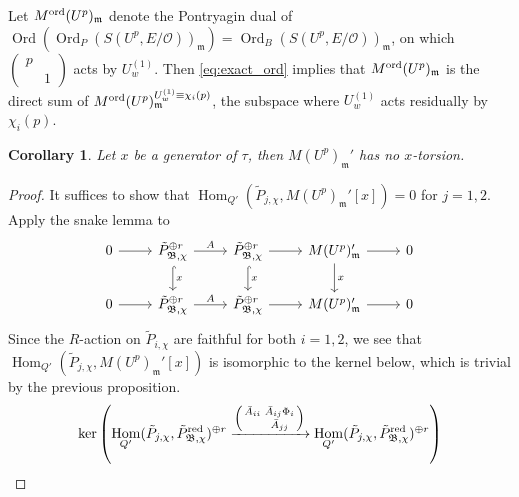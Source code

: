 \documentclass[leqno]{amsart}
\newcommand{\smat}[1]{\left( \begin{smallmatrix} #1 \end{smallmatrix} \right)}
\newcommand{\B}{\mathfrak B}
\DeclareMathOperator{\Ord}{Ord}
\newcommand{\red}{\textnormal{red}}
\newcommand{\ord}{\textnormal{ord}}
\newcommand{\oo}{\mathcal{O}} %
\newcommand{\fm}{\mathfrak{m}}
\DeclareMathOperator{\Hom}{Hom}
\newtheorem{cor}[thm]{Corollary}
\theoremstyle{definition}
\theoremstyle{remark}
\begin{document}
Let $M^{\ord}(U^p)_\fm$
denote the Pontryagin dual
of $\Ord(\Ord_P(S(U^p,E/\oo))_{\fm})=\Ord_B(S(U^p,E/\oo))_{\fm}$,
on which $\smat{p&\\&1}$ acts by  $U_{w}^{(1)}$.
Then \eqref{eq:exact_ord}
implies that 
$M^{\ord}(U^p)_{\fm}$ is the direct sum of 
$M^{\ord}(U^p)_{\fm}^{U_{w}^{(1)}\equiv \chi_i(p)}$,
the subspace where $U_{w}^{(1)}$ acts residually by $\chi_i(p)$.

\begin{cor}\label{cor:no_torsion}
	Let $x$ be a generator
	of $\tau$, then $M(U^p)_{\fm}'$
	has no $x$-torsion.
\end{cor}
\begin{proof}
	It suffices to show that
	$\Hom_{Q'}(\tilde{P}_{j,\chi}, M(U^p)_{\fm}'[x])=0$
	for $j=1,2$.
	Apply the snake lemma to
    \begin{equation*}
    \begin{tikzcd}
        0 \arrow[r] & \tilde{P}_{\B,\chi}^{\oplus r} 
	\arrow[d,"x",hookrightarrow] \arrow[r,"A"] & 
	\tilde{P}_{\B,\chi}^{\oplus r} 
	\arrow[d,"x",hookrightarrow] \arrow[r] & 
	M(U^p)_{\fm}'\arrow[d,"x"] \arrow[r] & 0 \\ 
        0 \arrow[r] & \tilde{P}_{\B,\chi}^{\oplus r}
	\arrow[r,"A"] & \tilde{P}_{\B,\chi}^{\oplus r}
	\arrow[r] &M(U^p)_{\fm}'  \arrow[r] & 0 
    \end{tikzcd}
\end{equation*}
Since the $R$-action
on $\tilde{P}_{i,\chi}$ are faithful for both $i=1,2$,
we see that $\Hom_{Q'}(\tilde{P}_{j,\chi}, M(U^p)_{\fm}'[x])$
is isomorphic to the kernel below,
which is trivial by the previous proposition.
\[
	\ker\left(
	\Hom_{Q'}(\tilde{P}_{j,\chi}, 
	\tilde{P}_{\B,\chi}^{\red})^{\oplus r}
	\xrightarrow{\smat{\bar{A}_{ii}& \bar{A}_{ij}\Phi_{i}\\& \bar{A}_{jj}}}
	\Hom_{Q'}(\tilde{P}_{j,\chi}, 
	\tilde{P}_{\B,\chi}^{\red})^{\oplus r}\right)
\]
\end{proof}
\end{document}
